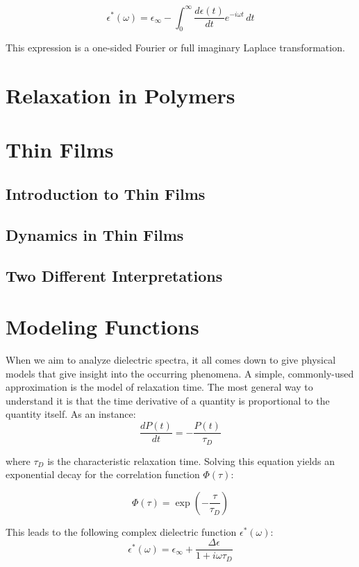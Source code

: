 \[
\epsilon^*(\omega) = \epsilon_\infty - \int_{0}^{\infty} \frac{d\epsilon(t)}{dt} e^{-i\omega t} \, dt
\]

This expression is a one-sided Fourier or full imaginary Laplace transformation.
\section{Relaxation in Polymers}

\section{Thin Films}
\subsection{Introduction to Thin Films}
\subsection{Dynamics in Thin Films}
\subsection{Two Different Interpretations}

\section{Modeling Functions}

When we aim to analyze dielectric spectra, it all comes down to give physical models that give insight into the occurring phenomena. A simple, commonly-used approximation is the model of relaxation time. The most general way to understand it is that the time derivative of a quantity is proportional to the quantity itself. As an instance:
\[
\frac{dP(t)}{dt} = -\frac{P(t)}{\tau_D}
\]

where \( \tau_D \) is the characteristic relaxation time. Solving this equation yields an exponential decay for the correlation function \( \Phi(\tau) \):

\[
\Phi(\tau) = \exp\left(-\frac{\tau}{\tau_D}\right)
\]

This leads to the following complex dielectric function \( \epsilon^*(\omega) \):
\begin{equation}
\label{debye}
\epsilon^*(\omega) = \epsilon_\infty + \frac{\Delta \epsilon}{1 + i \omega \tau_D}
\end{equation}

